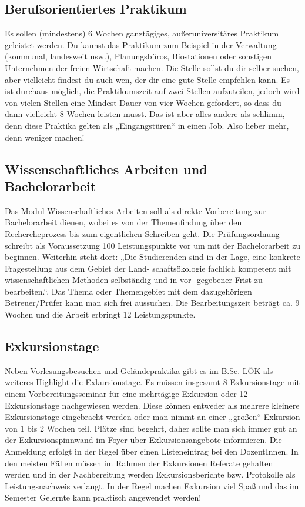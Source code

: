 \subsection*{Berufsorientiertes Praktikum}
Es sollen (mindestens) 6 Wochen ganztägiges, außeruniversitäres Praktikum geleistet werden. Du kannst das Praktikum zum Beispiel in der Verwaltung (kommunal, landesweit usw.), Planungsbüros, Biostationen oder sonstigen Unternehmen der freien Wirtschaft machen. Die Stelle sollst du dir selber suchen, aber vielleicht ﬁndest du auch wen, der dir eine gute Stelle empfehlen kann. Es ist durchaus möglich, die Praktikumszeit auf zwei Stellen aufzuteilen, jedoch wird von vielen Stellen eine Mindest-Dauer von vier Wochen gefordert, so dass du dann vielleicht 8 Wochen leisten musst. Das ist aber alles andere als schlimm, denn diese Praktika gelten als „Eingangstüren“ in einen Job. Also lieber mehr, denn weniger machen!

\subsection*{Wissenschaftliches Arbeiten und Bachelorarbeit}
Das Modul Wissenschaftliches Arbeiten soll als direkte Vorbereitung zur Bachelorarbeit dienen, wobei es von der Themenfindung über den Rechercheprozess bis zum eigentlichen Schreiben geht. Die Prüfungsordnung schreibt als Voraussetzung 100 Leistungspunkte vor um mit der Bachelorarbeit zu beginnen. Weiterhin steht dort: „Die Studierenden sind in der Lage, eine konkrete Fragestellung aus dem Gebiet der Land- schaftsökologie fachlich kompetent mit wissenschaftlichen Methoden selbständig und in vor- gegebener Frist zu bearbeiten.“. Das Thema oder Themengebiet mit dem dazugehörigen Betreuer/Prüfer kann man sich frei aussuchen. Die Bearbeitungszeit beträgt ca. 9 Wochen und die Arbeit erbringt 12 Leistungspunkte.

\subsection*{Exkursionstage}
Neben Vorlesungsbesuchen und Geländepraktika gibt es im B.Sc. LÖK als weiteres Highlight die Exkursionstage. Es müssen insgesamt 8 Exkursionstage mit einem Vorbereitungsseminar für eine mehrtägige Exkursion oder 12 Exkursionstage nachgewiesen werden. Diese können entweder als mehrere kleinere Exkursionstage eingebracht werden oder man nimmt an einer „großen“ Exkursion von 1 bis 2 Wochen teil. Plätze sind begehrt, daher sollte man sich immer gut an der Exkursionspinnwand im Foyer über Exkursionsangebote informieren. Die Anmeldung erfolgt in der Regel über einen Listeneintrag bei den DozentInnen. In den meisten Fällen müssen im Rahmen der Exkursionen Referate gehalten werden und in der Nachbereitung werden Exkursionsberichte bzw. Protokolle als Leistungsnachweis verlangt. In der Regel machen Exkursion viel Spaß und das im Semester Gelernte kann  praktisch angewendet werden!

